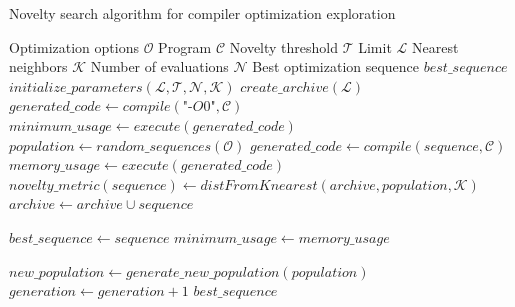 \begin{algorithm}
	\footnotesize
	\caption{Novelty search algorithm for compiler optimization exploration}
	\label{algo:search}
	\begin{algorithmic}[1]
		
		\REQUIRE Optimization options $\mathcal{O}$
		\REQUIRE Program $\mathcal{C}$
		\REQUIRE Novelty threshold $\mathcal{T}$
		\REQUIRE Limit $\mathcal{L}$
		\REQUIRE Nearest neighbors $\mathcal{K}$
		\REQUIRE Number of evaluations $\mathcal{N}$
		\ENSURE Best optimization sequence $best\_sequence$
		\STATE $initialize\_parameters(\mathcal{L},\mathcal{T},\mathcal{N},\mathcal{K})$
		\STATE $create\_archive(\mathcal{L})$
		\STATE 	$generated\_code \gets compile(\textit{"-O0"},\mathcal{C})$
		\STATE 	$minimum\_usage \gets execute(generated\_code)$
		\STATE $population \gets random\_sequences(\mathcal{O})$
		\REPEAT
		\STATE 	$generated\_code \gets compile(sequence,\mathcal{C})$
		\STATE 	$memory\_usage \gets execute(generated\_code)$
		\STATE	$novelty\_metric(sequence) \gets distFromKnearest(archive,population,\mathcal{K})$
		\STATE	$archive \gets archive \cup sequence$
		\ENDIF
		
		\STATE	$best\_sequence \gets sequence$
		\STATE	$minimum\_usage \gets memory\_usage$
		\ENDIF
		
		\ENDFOR
		\STATE		$new\_population \gets generate\_new\_population(population)$
		\STATE		$generation \gets generation + 1$
		\RETURN $best\_sequence$
	\end{algorithmic}
\end{algorithm}


